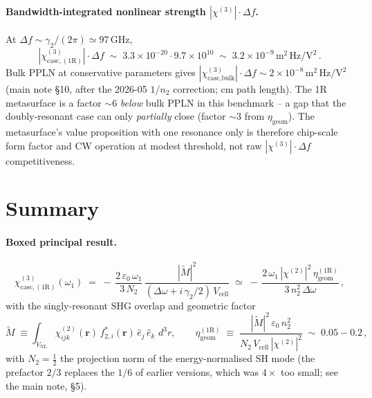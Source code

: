 \documentclass[11pt,a4paper]{article}
\newcommand{\eps}{\varepsilon}
\newcommand{\bvec}[1]{\mathbf{#1}}
\newcommand{\ri}{\bvec{r}}
\newcommand{\dthreer}{\,d^{3}r}
\newcommand{\chitwo}{\chi^{(2)}}
\newcommand{\chithree}{\chi^{(3)}}
\newcommand{\Dom}{\Delta\omega}
\newcommand{\chicascOneR}{\chi^{(3)}_{\text{casc},(1\mathrm R)}}
\newcommand{\Vunit}{V_{\text{cell}}}
\newcommand{\VNL}{V_{\text{NL}}}
\begin{document}
\paragraph{Bandwidth-integrated nonlinear strength
$|\chithree|\!\cdot\!\Delta f$.}
At $\Delta f\sim\gamma_2/(2\pi)\simeq 97\,$GHz,
\begin{equation}
  |\chicascOneR|\cdot\Delta f
   \;\sim\;3.3\!\times\!10^{-20}\cdot 9.7\!\times\!10^{10}
   \;\sim\;3.2\!\times\!10^{-9}\,\mathrm{m^{2}\,Hz/V^{2}}\,.
\end{equation}
Bulk PPLN at conservative parameters gives
$|\chithree_\text{casc,bulk}|\cdot\Delta f\sim 2\!\times\!10^{-8}\,
\mathrm{m^{2}\,Hz/V^{2}}$ (main note \S 10, after the 2026-05 $1/n_2$
correction; cm path length).  The 1R metasurface is a factor $\sim 6$
\emph{below} bulk PPLN in this benchmark -- a gap that the doubly-resonant
case can only \emph{partially} close (factor $\sim 3$ from $\eta_\text{geom}$).
The metasurface's value proposition with one resonance only is therefore
chip-scale form factor and CW operation at modest threshold, not raw
$|\chithree|\!\cdot\!\Delta f$ competitiveness.

\section{Summary}\label{sec:summary}

\paragraph{Boxed principal result.}
\begin{equation*}
  \boxed{\;
   \chicascOneR(\omega_1)
    \;=\;-\,\frac{2\,\eps_0\,\omega_1}{3\,N_2}\,
         \frac{|\widetilde M|^{2}}{(\Dom+i\,\gamma_2/2)\,\Vunit}
    \;\simeq\;-\,\frac{2\,\omega_1\,|\chitwo|^{2}\,\eta_\text{geom}^{(1\mathrm R)}}
                    {3\,n_2^{2}\,\Dom}\,,
   \;}
\end{equation*}
with the singly-resonant SHG overlap and geometric factor
\begin{equation*}
  \widetilde M\;\equiv\!\int_{\VNL}\!\chitwo_{ijk}(\ri)\,f_{2,i}^{*}(\ri)\,
    \hat e_j\,\hat e_k\,\dthreer,
  \qquad
  \eta_\text{geom}^{(1\mathrm R)}\;\equiv\;\frac{|\widetilde M|^{2}\,\eps_0\,n_2^{2}}
                                          {N_2\,\Vunit\,|\chitwo|^{2}}
  \;\sim\;0.05\!-\!0.2\,,
\end{equation*}
with $N_2=\tfrac12$ the projection norm of the energy-normalised SH mode
(the prefactor $2/3$ replaces the $1/6$ of earlier versions, which was
$4\times$ too small; see the main note, \S 5).
\end{document}
